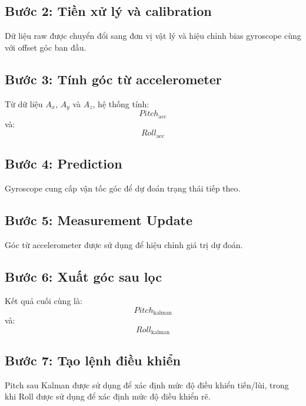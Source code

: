 \subsection{Bước 2: Tiền xử lý và calibration}

Dữ liệu raw được chuyển đổi sang đơn vị vật lý và hiệu chỉnh bias gyroscope cùng với offset góc ban đầu.

\subsection{Bước 3: Tính góc từ accelerometer}

Từ dữ liệu $A_x$, $A_y$ và $A_z$, hệ thống tính:
\begin{equation}
Pitch_{\text{acc}}
\end{equation}
và:
\begin{equation}
Roll_{\text{acc}}
\end{equation}

\subsection{Bước 4: Prediction}

Gyroscope cung cấp vận tốc góc để dự đoán trạng thái tiếp theo.

\subsection{Bước 5: Measurement Update}

Góc từ accelerometer được sử dụng để hiệu chỉnh giá trị dự đoán.

\subsection{Bước 6: Xuất góc sau lọc}

Kết quả cuối cùng là:
\begin{equation}
Pitch_{\text{kalman}}
\end{equation}
và:
\begin{equation}
Roll_{\text{kalman}}
\end{equation}

\subsection{Bước 7: Tạo lệnh điều khiển}

Pitch sau Kalman được sử dụng để xác định mức độ điều khiển tiến/lùi, trong khi Roll được sử dụng để xác định mức độ điều khiển rẽ.

